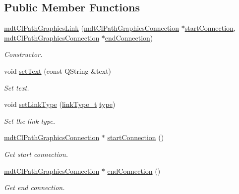 \subsection*{Public Member Functions}
\begin{DoxyCompactItemize}
\item 
\hyperlink{classmdt_cl_path_graphics_link_a31a182e084bd06785b6985eef7272580}{mdt\-Cl\-Path\-Graphics\-Link} (\hyperlink{classmdt_cl_path_graphics_connection}{mdt\-Cl\-Path\-Graphics\-Connection} $\ast$\hyperlink{classmdt_cl_path_graphics_link_a863277170ed3f2f893aee2ab7d768ac7}{start\-Connection}, \hyperlink{classmdt_cl_path_graphics_connection}{mdt\-Cl\-Path\-Graphics\-Connection} $\ast$\hyperlink{classmdt_cl_path_graphics_link_ada7934bce202c6b88c4aeacc612964e9}{end\-Connection})
\begin{DoxyCompactList}\small\item\em Constructor. \end{DoxyCompactList}\item 
void \hyperlink{classmdt_cl_path_graphics_link_ad3cbd811663e4b3b98d906bef622777c}{set\-Text} (const Q\-String \&text)
\begin{DoxyCompactList}\small\item\em Set text. \end{DoxyCompactList}\item 
void \hyperlink{classmdt_cl_path_graphics_link_a93e79f03e2ee609edf6342a065f21deb}{set\-Link\-Type} (\hyperlink{classmdt_cl_path_graphics_link_a6ac32ab30f4b6193fcd0cd4d3d51ea2d}{link\-Type\-\_\-t} \hyperlink{classmdt_cl_path_graphics_link_ab2f102d6d2dcac5da1e62188f19dbfcd}{type})
\begin{DoxyCompactList}\small\item\em Set the link type. \end{DoxyCompactList}\item 
\hyperlink{classmdt_cl_path_graphics_connection}{mdt\-Cl\-Path\-Graphics\-Connection} $\ast$ \hyperlink{classmdt_cl_path_graphics_link_a863277170ed3f2f893aee2ab7d768ac7}{start\-Connection} ()
\begin{DoxyCompactList}\small\item\em Get start connection. \end{DoxyCompactList}\item 
\hyperlink{classmdt_cl_path_graphics_connection}{mdt\-Cl\-Path\-Graphics\-Connection} $\ast$ \hyperlink{classmdt_cl_path_graphics_link_ada7934bce202c6b88c4aeacc612964e9}{end\-Connection} ()
\begin{DoxyCompactList}\small\item\em Get end connection. \end{DoxyCompactList}\item 

\end{DoxyCompactItemize}
